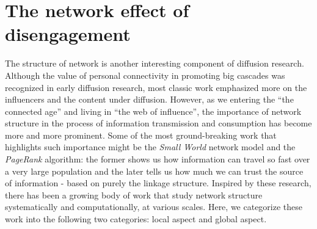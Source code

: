\documentclass[phd,tocprelim]{cornell}
\begin{document}
\section{The network effect of disengagement}
The structure of network is another interesting component of diffusion research. 
Although the value of personal connectivity in promoting big cascades was recognized in early diffusion research\cite{Rogers:2003,katz_lazarsfeld,katz_57}, most classic work emphasized more on the influencers and the content under diffusion. However, as we entering the ``the connected age''\cite{Watts-2004} and living in ``the web of influence''\cite{christakis-2011},  the importance of network structure 
in the process of information transmission and consumption has become more and more prominent. 
Some of the most ground-breaking work that highlights such importance might be the \emph{Small World} network model\cite{Watts-1998} and the \emph{PageRank} algorithm\cite{Brin:1998}: the former shows us how information can travel so fast over a very large population and the later tells us how much we can trust the source of information - based on purely the linkage structure. Inspired by these research, there has been a growing body of work that study network structure systematically and computationally, at various scales. Here, we categorize these work into the following two categories: local aspect and global aspect.
\end{document}
